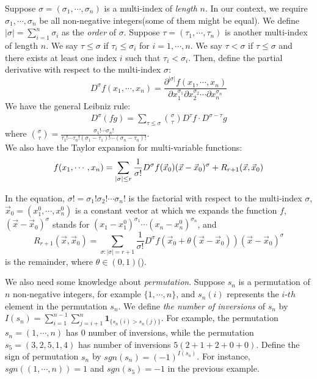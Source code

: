 Suppose $\sigma = (\sigma_{1},\cdots,\sigma_{n})$ is a multi-index of \emph{length} $n$. In our context, we require $\sigma_{1},\cdots,\sigma_{n}$ be all non-negative integers(some of them might be equal). We define $|\sigma|=\sum_{i=1}^{n}\sigma_{i}$ as the \emph{order} of $\sigma$. Suppose $\tau=(\tau_{1},\cdots,\tau_{n})$ is another multi-index of length $n$. We say $\tau\leq\sigma$ if $\tau_{i}\leq \sigma_{i}$ for $i=1,\cdots,n$. We say $\tau<\sigma$ if $\tau\leq \sigma$ and there exists at least one index $i$ such that $\tau_{i}<\sigma_{i}$. Then, define the partial derivative with respect to the multi-index $\sigma$:
$$D^{\sigma}f(x_{1},\cdots,x_{n})=\frac{\partial^{|\sigma|}f(x_{1},\cdots,x_{n})}{\partial x_{1}^{\sigma_{1}}\partial x_{2}^{\sigma_{2}}\cdots \partial x_{n}^{\sigma_{n}}}$$ We have the general Leibniz rule:
\begin{align*}
	D^{\sigma}(fg)=\sum_{\tau\leq\sigma}\binom{\sigma}{\tau}D^{\tau}f\cdot D^{\sigma-\tau}g
\end{align*}
where $\binom{\sigma}{\tau}=\frac{\sigma_{1}!\cdots\sigma_{n}!}{\tau_{1}!\cdots\tau_{n}!(\sigma_{1}-\tau_{1})!\cdots(\sigma_{n}-\tau_{n})!}$.\\
We also have the Taylor expansion for multi-variable functions:
\begin{equation}{\label{MultiTaylor}}
	f(x_{1},\cdots,x_{n})=\sum_{|\sigma|\leq r}\frac{1}{\sigma!}D^{\sigma}f(\vec{x}_{0})(\vec{x}-\vec{x}_{0})^{\sigma}+R_{r+1}(\vec{x},\vec{x}_{0})
\end{equation}
 
In the equation, $\sigma!=\sigma_{1}!\sigma_{2}!\cdots\sigma_{n}!$ is the factorial with respect to the multi-index $\sigma$, $\vec{x}_{0}=(x_{1}^{0},\cdots,x_{n}^{0})$ is a constant vector at which we expands the function $f$, $(\vec{x}-\vec{x}_{0})^{\sigma}$ stands for $(x_{1}-x_{1}^{0})^{\sigma_{1}}\cdots(x_{n}-x_{n}^{0})^{\sigma_{n}}$, and $$R_{r+1}(\vec{x},\vec{x}_{0})=\sum_{\sigma:|\sigma|=r+1}\frac{1}{\sigma!}D^{\sigma}f(\vec{x}_{0}+\theta(\vec{x}-\vec{x}_{0}))(\vec{x}-\vec{x}_{0})^{\sigma}$$ is the remainder, where $\theta\in (0,1)$(\cite[Theorem 3.18 \& Corollary 3.19]{CJ}).

We also need some knowledge about \emph{permutation}. Suppose $s_{n}$ is a permutation of $n$ non-negative integers, for example $\{1,\cdots,n\}$, and $s_{n}(i)$ represents the $i$-$th$ element in the permutation $s_{n}$. We define \emph{the number of inversions} of $s_{n}$ by $I(s_{n})=\sum_{i=1}^{n-1}\sum_{j=i+1}^{n}\mathbf{1}_{\{s_{n}(i)>s_{n}(j)\}}$. For example, the permutation $s_{n}=(1,\cdots,n)$ has $0$ number of inversions, while the permutation $s_{5}=(3,2,5,1,4)$ has number of inversions $5(2+1+2+0+0)$. Define the sign of permutation $s_{n}$ by $sgn(s_{n})=(-1)^{I(s_{n})}$. For instance, $sgn((1,\cdots,n))=1$ and $sgn(s_{5})=-1$ in the previous example.

